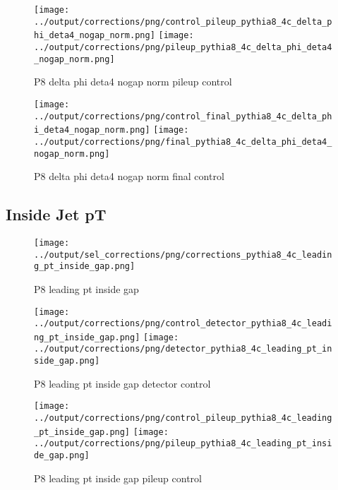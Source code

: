 \documentclass[11pt]{book}
\begin{document}
\begin{figure}[ht]
\centering
\texttt{[image: ../output/corrections/png/control\_pileup\_pythia8\_4c\_delta\_phi\_deta4\_nogap\_norm.png]}
\texttt{[image: ../output/corrections/png/pileup\_pythia8\_4c\_delta\_phi\_deta4\_nogap\_norm.png]}
\caption{P8 delta phi deta4 nogap norm pileup control}
\label{fig:p8_delta_phi_deta4_nogap_norm_pileup_control}
\end{figure}


\begin{figure}[ht]
\centering
\texttt{[image: ../output/corrections/png/control\_final\_pythia8\_4c\_delta\_phi\_deta4\_nogap\_norm.png]}
\texttt{[image: ../output/corrections/png/final\_pythia8\_4c\_delta\_phi\_deta4\_nogap\_norm.png]}
\caption{P8 delta phi deta4 nogap norm final control}
\label{fig:p8_delta_phi_deta4_nogap_norm_final_control}
\end{figure}



\clearpage
\subsection{Inside Jet pT}
\begin{figure}[ht]
\centering
\texttt{[image: ../output/sel\_corrections/png/corrections\_pythia8\_4c\_leading\_pt\_inside\_gap.png]}
\caption{P8 leading pt inside gap}
\label{fig:p8_leading_pt_inside_gap}
\end{figure}

\begin{figure}[ht]
\centering
\texttt{[image: ../output/corrections/png/control\_detector\_pythia8\_4c\_leading\_pt\_inside\_gap.png]}
\texttt{[image: ../output/corrections/png/detector\_pythia8\_4c\_leading\_pt\_inside\_gap.png]}
\caption{P8 leading pt inside gap detector control}
\label{fig:p8_leading_pt_inside_gap_detector_control}
\end{figure}

\begin{figure}[ht]
\centering
\texttt{[image: ../output/corrections/png/control\_pileup\_pythia8\_4c\_leading\_pt\_inside\_gap.png]}
\texttt{[image: ../output/corrections/png/pileup\_pythia8\_4c\_leading\_pt\_inside\_gap.png]}
\caption{P8 leading pt inside gap pileup control}
\label{fig:p8_leading_pt_inside_gap_pileup_control}
\end{figure}
\end{document}
